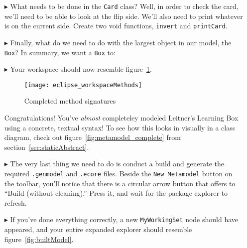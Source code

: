 \begin{itemize}
\item[$\blacktriangleright$] What needs to be done in the \texttt{Card} class? Well, in order to check the card, we'll need to be able to look at the flip side. We'll also need to print whatever is on the current side. Create two void functions, \texttt{invert} and \texttt{printCard}.

\vfill
\pagebreak

\item[$\blacktriangleright$] Finally, what do we need to do with the largest object in our model, the \texttt{Box}? In summary, we want a \texttt{Box} to:



\item[$\blacktriangleright$] Your workspace should now resemble figure~\ref{fig:workspaceMethods}.
\begin{figure}[htbp]
	\centering
  \texttt{[image: eclipse\_workspaceMethods]}
	\caption{Completed method signatures}
	\label{fig:workspaceMethods}
\end{figure}


Congratulations! You've \emph{almost} completeley modeled Leitner's Learning Box using a concrete, textual syntax! To see how this looks in visually in a class diagram, check out figure~\ref{fig:metamodel_complete} from section~\ref{sec:staticAbstract}.

\item[$\blacktriangleright$]The very last thing we need to do is conduct a build and generate the required \texttt{.genmodel} and \texttt{.ecore} files. Beside the \texttt{New Metamodel} button on the toolbar, you'll notice that there is a circular arrow button that offers to ``Build (without cleaning).''   %
Press it, and wait for the package explorer to refresh.

\item[$\blacktriangleright$] If you've done everything correctly, a new \texttt{MyWorkingSet} node should have appeared, and your entire expanded explorer should resemble figure~\ref{fig:builtModel}.


\end{itemize}
